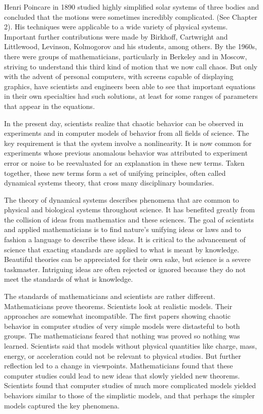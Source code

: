\documentclass[12pt]{article}
\begin{document}
Henri Poincare in 1890 studied highly simplified solar systems of three bodies and concluded that the 
motions were sometimes incredibly complicated. (See Chapter 2). His techniques were applicable to a wide 
variety of physical systems. Important further contributions were made by Birkhoff, Cartwright and 
Littlewood, Levinson, Kolmogorov and his students, among others. By the 1960s, there were groups of 
mathematicians, particularly in Berkeley and in Moscow, striving to understand this third kind of motion 
that we now call chaos. But only with the advent of personal computers, with screens capable of displaying 
graphics, have scientists and engineers been able to see that important equations in their own specialties 
had such solutions, at least for some ranges of parameters that appear in the equations.

In the present day, scientists realize that chaotic behavior can be observed in experiments and in computer 
models of behavior from all fields of science. The key requirement is that the system involve a 
nonlinearity. It is now common for experiments whose previous anomalous behavior was attributed to 
experiment error or noise to be reevaluated for an explanation in these new terms. Taken together, these 
new terms form a set of unifying principles, often called dynamical systems theory, that cross many 
disciplinary boundaries.

The theory of dynamical systems describes phenomena that are common to physical and biological systems 
throughout science. It has benefited greatly from the collision of ideas from mathematics and these 
sciences. The goal of scientists and applied mathematicians is to find nature’s unifying ideas or laws and 
to fashion a language to describe these ideas. It is critical to the advancement of science that exacting 
standards are applied to what is meant by knowledge. Beautiful theories can be appreciated for their own 
sake, but science is a severe taskmaster. Intriguing ideas are often rejected or ignored because they do 
not meet the standards of what is knowledge.

The standards of mathematicians and scientists are rather different. Mathematicians prove theorems. 
Scientists look at realistic models. Their approaches are somewhat incompatible. The first papers showing 
chaotic behavior in computer studies of very simple models 
were distasteful to both groups. The mathematicians feared that nothing was proved so nothing was learned. 
Scientists said that models without physical quantities like charge, mass, energy, or acceleration could 
not be relevant to physical studies. But further reflection led to a change in viewpoints. Mathematicians 
found that these computer studies could lead to new ideas that slowly yielded new theorems. Scientists 
found that computer studies of much more complicated models yielded behaviors similar to those of the 
simplistic models, and that perhaps the simpler models captured the key phenomena.
\end{document}
